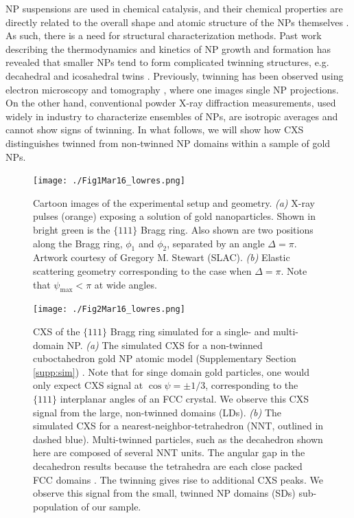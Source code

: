 \documentclass [12pt,fleqn]{article}
\begin{document}
NP suspensions are used in chemical catalysis, and their chemical properties are directly related to  the overall shape and atomic structure of the NPs themselves \cite{yacaman1981effect, narayanan2005catalysis, narayanan2004shape}. As such, there is a need for structural characterization methods. Past work describing the thermodynamics and kinetics of NP growth and formation \cite{ino1969stability, marks1983modified, howie1984elastic, marks1984surface, ringe2013kinetic} has revealed that smaller NPs tend to form complicated twinning structures, e.g. decahedral and icosahedral twins \cite{heinemann1979structure, yacaman1979structure, langille2012stepwise, yang1979crystallography, yang1979crystallography2, dai2002shapes}. Previously, twinning has been observed using electron microscopy and tomography \cite{marks1981high, yacaman1992electron, chen2013three}, where one images single NP projections. On the other hand, conventional powder X-ray diffraction measurements, used widely in industry to characterize ensembles of NPs, are isotropic averages and cannot show signs of twinning. In what follows, we will show how CXS distinguishes  twinned from non-twinned NP domains within a sample of gold NPs.

\begin{figure}[H]
\begin{center}
\texttt{[image: ./Fig1Mar16\_lowres.png]}
\end{center}
\caption{Cartoon images of the experimental setup and geometry. \emph{(a)} X-ray pulses (orange) exposing a solution of gold nanoparticles. Shown in bright green is the $\{111\}$ Bragg ring. Also shown are two positions along the Bragg ring, $\phi_1$ and $\phi_2$, separated by an angle $\Delta=\pi$. Artwork courtesy of Gregory M. Stewart (SLAC). \emph{(b)} Elastic scattering geometry corresponding to the case when $\Delta = \pi$. Note that $\psi_{\max} < \pi$ at wide angles.}
\label{fig:setup}
\end{figure}

\begin{figure}[H]
\begin{center}
\texttt{[image: ./Fig2Mar16\_lowres.png]}
\end{center}
\caption{CXS of the $\{111\}$ Bragg ring simulated for a single- and multi-domain NP. \emph{(a)} The simulated CXS for a non-twinned cuboctahedron gold NP atomic model (Supplementary Section \ref{supp:sim}) . Note that for singe domain gold particles, one would only expect CXS signal at $\cos \psi  = \pm 1/3$, corresponding to the $\{111\}$ interplanar angles of an FCC crystal. We observe this CXS signal from the large, non-twinned domains (LDs).  \emph{(b)} The simulated CXS for a nearest-neighbor-tetrahedron (NNT, outlined in dashed blue). Multi-twinned particles, such as the decahedron shown here are composed of several NNT units. The angular gap in the decahedron results because the tetrahedra are each close packed FCC domains \cite{yang1979crystallography}. The twinning gives rise to additional CXS peaks. We observe this signal from the small, twinned NP domains (SDs) sub-population of our sample.}
\label{fig:contrast}
\end{figure}
\end{document}
